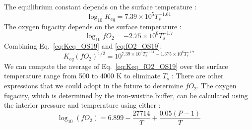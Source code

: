 The equilibrium constant depends on the surface temperature \citep[Eq.~41,][]{OS19}:
\begin{equation}
    \log_{10} K_{eq} = 7.39\times 10^5T_s^{-1.61}
    \label{eq:Keq_OS19}
\end{equation}
The oxygen fugacity depends on the surface temperature \citep[Eq.~40,][]{OS19}:
\begin{equation}
\log_{10} fO_2 = -2.75 \times 10^6 T_s^{-1.7}
\label{eq:fO2_OS19}
\end{equation}
Combining Eq.~\ref{eq:Keq_OS19} and \ref{eq:fO2_OS19}:
\begin{equation}
K_{eq} (fO_2)^{1/2} = 10^{7.39 \times 10^5 T_s^{-1.61}-1.375 \times 10^6 T_s^{-1.7}}
\label{eq:Keq_fO2_OS19}
\end{equation}
We can compute the  average of Eq.~\ref{eq:Keq_fO2_OS19} over the surface temperature range from 500 to 4000 K to eliminate $T_s$ :
There are other expressions that we could adopt in the future to determine $fO_2$.  The oxygen fugacity, which is determined by the iron-w\"{u}stite buffer, can be calculated using the interior pressure and temperature using either \citep{O87}: 
\begin{equation}
    \log_{10}\left(fO_2\right) = 6.899 - \frac{27714}{T} + \frac{0.05(P-1)}{T}
\end{equation}
